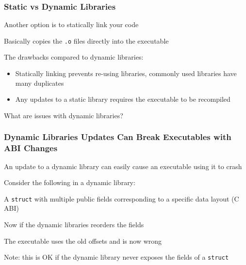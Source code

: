   \begin{frame}
    \frametitle{Static vs Dynamic Libraries}

    Another option is to statically link your code

    \hspace{1em} Basically copies the \texttt{.o} files directly into the
    executable

    \vspace{2em}

    The drawbacks compared to dynamic libraries:
    \begin{itemize}
      \item Statically linking prevents re-using libraries, commonly used
            libraries have many duplicates
      \item Any updates to a static library requires the executable to be
            recompiled
    \end{itemize}

    \vspace{2em}

    What are issues with dynamic libraries?
  \end{frame}

  \begin{frame}
    \frametitle{Dynamic Libraries Updates Can Break Executables with ABI
                Changes}

    An update to a dynamic library can easily cause an executable using it to
    crash

    \vspace{1em}

    Consider the following in a dynamic library:

    \hspace{1em} A \texttt{struct} with multiple public fields corresponding to
    a specific data layout (C ABI)

    \vspace{1em}


    \vspace{1em}

    Now if the dynamic libraries reorders the fields

    \hspace{1em} The executable uses the old offsets and is now wrong

    \vspace{1em}

    Note: this is OK if the dynamic library never exposes the fields of a
    \texttt{struct}
  \end{frame}


